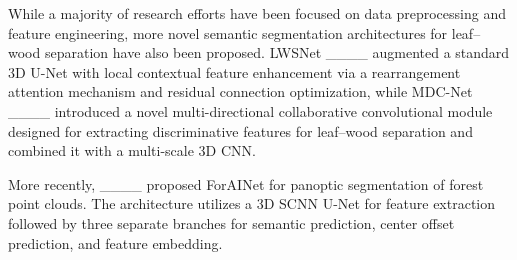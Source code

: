 While a majority of research efforts have been focused on data preprocessing and feature engineering, more novel semantic segmentation architectures for leaf--wood separation have also been proposed. LWSNet ____ augmented a standard 3D U-Net with local contextual feature enhancement via a rearrangement attention mechanism and residual connection optimization, while MDC-Net ____ introduced a novel multi-directional collaborative convolutional module designed for extracting discriminative features for leaf--wood separation and combined it with a multi-scale 3D CNN.

More recently, ____ proposed ForAINet for panoptic segmentation of forest point clouds. The architecture utilizes a 3D SCNN U-Net for feature extraction followed by three separate branches for semantic prediction, center offset prediction, and feature embedding.